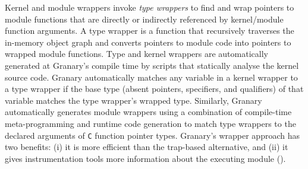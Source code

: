 \documentclass[preprint]{sigplanconf}
\begin{document}
Kernel and module wrappers invoke \emph{type wrappers} to find and wrap pointers to module functions that are directly or indirectly referenced by kernel/module function arguments. A type wrapper is a function that recursively  traverses the in-memory object graph and converts pointers to module code into pointers to wrapped module functions. Type and kernel wrappers are automatically generated at Granary's compile time by scripts that statically analyse the kernel source code. Granary automatically matches any variable in a kernel wrapper to a type wrapper if the base type (absent pointers, specifiers, and qualifiers) of that variable matches the type wrapper's wrapped type. Similarly, Granary automatically generates module wrappers using a combination of compile-time meta-programming and runtime code generation to match type wrappers to the declared arguments of \texttt{C} function pointer types.  Granary's wrapper approach has two benefits: (i) it is more efficient than the trap-based alternative, and (ii) it gives instrumentation tools more information about the executing module ().









\end{document}
